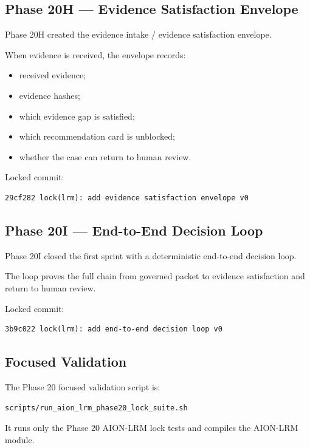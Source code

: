 \subsection{Phase 20H --- Evidence Satisfaction Envelope}

Phase 20H created the evidence intake / evidence satisfaction envelope.

When evidence is received, the envelope records:

\begin{itemize}
  \item received evidence;
  \item evidence hashes;
  \item which evidence gap is satisfied;
  \item which recommendation card is unblocked;
  \item whether the case can return to human review.
\end{itemize}

Locked commit:

\begin{verbatim}
29cf282 lock(lrm): add evidence satisfaction envelope v0
\end{verbatim}

\subsection{Phase 20I --- End-to-End Decision Loop}

Phase 20I closed the first sprint with a deterministic end-to-end decision loop.

The loop proves the full chain from governed packet to evidence satisfaction and return to human review.

Locked commit:

\begin{verbatim}
3b9c022 lock(lrm): add end-to-end decision loop v0
\end{verbatim}

\subsection{Focused Validation}

The Phase 20 focused validation script is:

\begin{verbatim}
scripts/run_aion_lrm_phase20_lock_suite.sh
\end{verbatim}

It runs only the Phase 20 AION-LRM lock tests and compiles the AION-LRM module.

